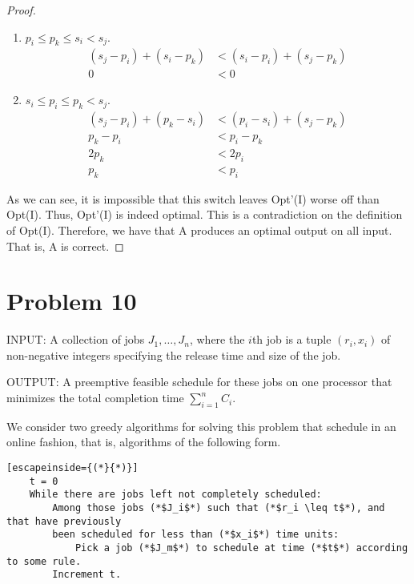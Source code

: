 \documentclass{article}
\providecommand{\prob}[1]{\section*{Problem #1}}
\begin{document}
\begin{enumerate}[label=(\alph*)]
\begin{proof}
\begin{enumerate}[label=Case \arabic*.]
                \item $ p_i \leq p_k \leq s_i < s_j $.
                \begin{align*}
                    (s_j - p_i) + (s_i - p_k) &< (s_i - p_i) + (s_j - p_k)\\
                    0 &< 0
                \end{align*}
                
                \item $ s_i \leq p_i \leq p_k < s_j $.
                \begin{align*}
                    (s_j - p_i) + (p_k - s_i) &< (p_i - s_i) + (s_j - p_k)\\
                    p_k - p_i &< p_i - p_k\\
                    2p_k &< 2p_i\\
                    p_k &< p_i
                \end{align*}
            \end{enumerate}
            
            As we can see, it is impossible that this switch leaves Opt'(I) worse off than Opt(I).
            Thus, Opt'(I) is indeed optimal.
            This is a contradiction on the definition of Opt(I).
            Therefore, we have that A produces an optimal output on all input.
            That is, A is correct.
        \end{proof}
    \end{enumerate}
    
    \pagebreak %
    \prob{10}
    INPUT: A collection of jobs $J_1, \dots, J_n$, where the $i$th job is a tuple $(r_i, x_i)$ of non-negative integers specifying the release time and size of the job.
    
    OUTPUT: A preemptive feasible schedule for these jobs on one processor that minimizes the total completion time $\sum_{i=1}^{n} C_i$.
    
    We consider two greedy algorithms for solving this problem that schedule in an online fashion, that is, algorithms of the following form.
    \begin{lstlisting}[escapeinside={(*}{*)}]
    t = 0
    While there are jobs left not completely scheduled:
        Among those jobs (*$J_i$*) such that (*$r_i \leq t$*), and that have previously 
        been scheduled for less than (*$x_i$*) time units:
            Pick a job (*$J_m$*) to schedule at time (*$t$*) according to some rule.
        Increment t.
    \end{lstlisting}
    
\end{document}
